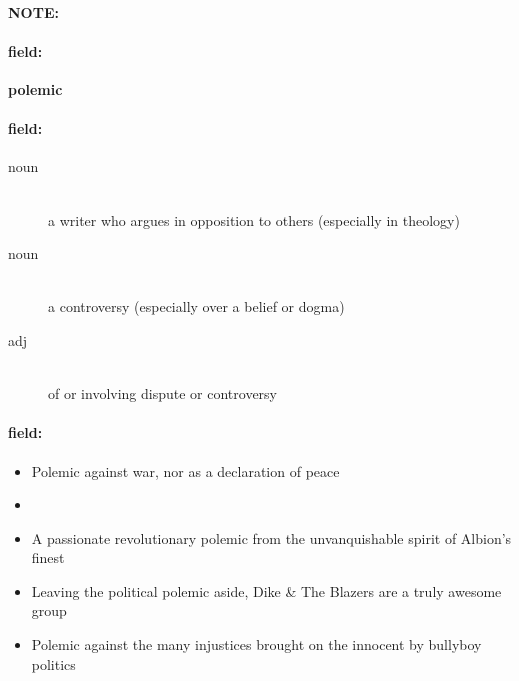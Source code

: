 \documentclass[12pt]{article}
\newenvironment{note}{\paragraph{NOTE:}}{}
\newenvironment{field}{\paragraph{field:}}{}
\begin{document}
\begin{note}
\begin{field}
\textbf{\large polemic}
\end{field}


\begin{field}
\begin{description}
\item[noun] \hfill \\ 
a writer who argues in opposition to others (especially in theology)

\item[noun] \hfill \\ 
a controversy (especially over a belief or dogma)

\item[adj] \hfill \\ 
of or involving dispute or controversy

\end{description}
\end{field}

\begin{field}
\begin{itemize}
\item Polemic against war, nor as a declaration of peace
\item 
\item A passionate revolutionary polemic from the unvanquishable spirit of Albion's finest
\item Leaving the political polemic aside, Dike & The Blazers are a truly awesome group
\item Polemic against the many injustices brought on the innocent by bullyboy politics
\end{itemize}
\end{field}
\end{note}
\end{document}
